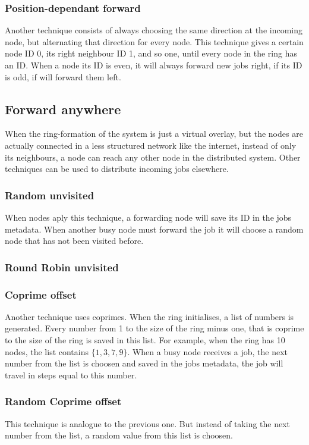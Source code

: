 \documentclass[10pt,a4paper]{article}
\begin{document}
\subsubsection{Position-dependant forward}
Another technique consists of always choosing the same direction at the incoming node, but alternating that direction for every node. This technique gives a certain node ID 0, its right neighbour ID 1, and so one, until every node in the ring has an ID. When a node its ID is even, it will always forward new jobs right, if its ID is odd, if will forward them left.

\subsection{Forward anywhere}
When the ring-formation of the system is just a virtual overlay, but the nodes are actually connected in a less structured network like the internet, instead of only its neighbours, a node can reach any other node in the distributed system. Other techniques can be used to distribute incoming jobs elsewhere.

\subsubsection{Random unvisited}
When nodes aply this technique, a forwarding node will save its ID in the jobs metadata. When another busy node must forward the job it will choose a random node that has not been visited before.


\subsubsection{Round Robin unvisited}

\subsubsection{Coprime offset}
Another technique uses coprimes. When the ring initialises, a list of numbers is generated. Every number from 1 to the size of the ring minus one, that is coprime to the size of the ring is saved in this list. For example, when the ring has 10 nodes, the list contains $\{1, 3 , 7 , 9\}$. When a busy node receives a job, the next number from the list is choosen and saved in the jobs metadata, the job will travel in steps equal to this number.

\subsubsection{Random Coprime offset}
This technique is analogue to the previous one. But instead of taking the next number from the list, a random value from this list is choosen.
\end{document}
